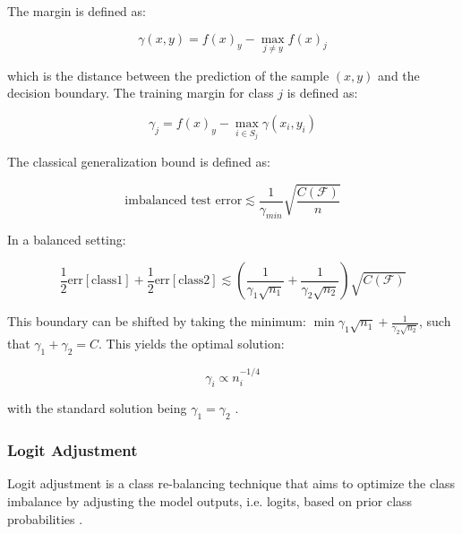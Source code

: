\noindent The margin is defined as:

\begin{equation}
    \label{eq:margin_def}
    \gamma(x,y) = f(x)_y - \max_{j \neq y}f(x)_j
\end{equation}

\noindent which is the distance between the prediction of the sample $(x,y)$ and the decision boundary. The training margin for class $j$ is defined as:

\begin{equation}
    \label{eq:margin_class_def}
    \gamma_j = f(x)_y - \max_{i \in S_j}\gamma(x_i,y_i)
\end{equation}

\noindent The classical generalization bound is defined as:

\begin{equation}
    \label{eq:gen_bound}
    \text{imbalanced test error}\lesssim \frac{1}{\gamma_{min}}\sqrt{\frac{C(\mathcal{F})}{n}}
\end{equation}

\noindent In a balanced setting:

\begin{equation}
    \frac{1}{2}\text{err}[\text{class1}]+\frac{1}{2}\text{err}[\text{class2}] \lesssim \left(\frac{1}{\gamma_1\sqrt{n_1}}+\frac{1}{\gamma_2\sqrt{n_2}}\right)\sqrt{C(\mathcal{F})}
\end{equation}

\noindent This boundary can be shifted by taking the minimum: $\min{\gamma_1\sqrt{n_1}}+\frac{1}{\gamma_2\sqrt{n_2}}$, such that $\gamma_1+\gamma_2=C$. This yields the optimal solution:

\begin{equation}
    \label{eq:opt_margin}
    \gamma_i\varpropto n^{-1/4}_i 
\end{equation}

\noindent with the standard solution being $\gamma_1=\gamma_2$ \cite{cao2019learningimbalanceddatasetslabeldistributionaware}. 

\subsubsection{Logit Adjustment}
\label{sec:logit_adjustment}
Logit adjustment is a class re-balancing technique that aims to optimize the class imbalance by adjusting the model outputs, i.e. logits, based on prior class probabilities \cite{menon2021longtaillearninglogitadjustment,ren2020balancedmetasoftmaxlongtailedvisual}.  

